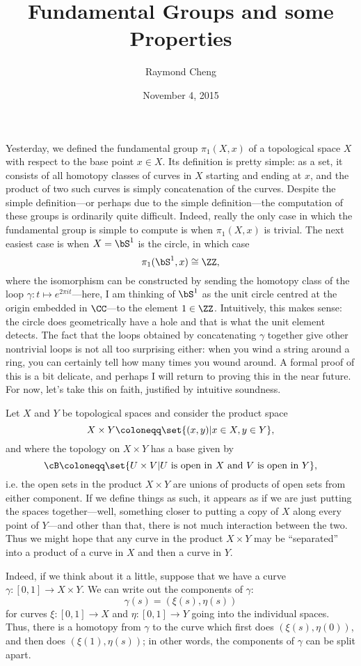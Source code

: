 \documentclass{axolotl}
\title{Fundamental Groups and some Properties}
\author{Raymond Cheng}
\date{November 4, 2015}
\begin{document}
\maketitle
{}
Yesterday, we defined the fundamental group \(\pi_1(X,x)\) of a topological
space \(X\) with respect to the base point \(x \in X\). Its definition is
pretty simple: as a set, it consists of all homotopy classes of curves in \(X\)
starting and ending at \(x\), and the product of two such curves is simply
concatenation of the curves. Despite the simple definition---or perhaps due to
the simple definition---the computation of these groups is ordinarily quite
difficult. Indeed, really the only case in which the fundamental group is simple
to compute is when \(\pi_1(X,x)\) is trivial. The next easiest case is when
\(X = \bS^1\) is the circle, in which case
\[ \pi_1(\bS^1,x) \cong \ZZ, \]
where the isomorphism can be constructed by sending the homotopy class of the
loop \(\gamma: t \mapsto e^{2\pi it}\)---here, I am thinking of \(\bS^1\) as
the unit circle centred at the origin embedded in \(\CC\)---to the element \(1
  \in \ZZ\). Intuitively, this makes sense: the circle does geometrically have
a hole and that is what the unit element detects. The fact that the loops
obtained by concatenating \(\gamma\) together give other nontrivial loops is
not all too surprising either: when you wind a string around a ring, you can
certainly tell how many times you wound around. A formal proof of this is a bit
delicate, and perhaps I will return to proving this in the near future. For
now, let's take this on faith, justified by intuitive soundness.

Let \(X\) and \(Y\) be topological spaces and consider the product space
\[ X \times Y \coloneqq \set{(x,y) | x \in X, y \in Y}, \]
and where the topology on \(X \times Y\) has a base given by
\[ \cB \coloneqq \set{U \times V | \text{\(U\) is open in \(X\) and \(V\) is open in \(Y\)}}, \]
i.e. the open sets in the product \(X \times Y\) are unions of products of open
sets from either component. If we define things as such, it appears as if we are
just putting the spaces together---well, something closer to putting a copy of \(X\)
along every point of \(Y\)---and other than that, there is not much interaction
between the two. Thus we might hope that any curve in the product \(X \times Y\)
may be ``separated'' into a product of a curve in \(X\) and then a curve in \(Y\).

Indeed, if we think about it a little, suppose that we have a curve \(\gamma:
  [0,1] \to X \times Y\). We can write out the components of \(\gamma\):
\[ \gamma(s) = (\xi(s),\eta(s)) \]
for curves \(\xi: [0,1] \to X\) and \(\eta: [0,1] \to Y\) going into the
individual spaces. Thus, there is a homotopy from \(\gamma\) to the curve which
first does \((\xi(s),\eta(0))\), and then does \((\xi(1),\eta(s))\); in other
words, the components of \(\gamma\) can be split apart.
\end{document}
